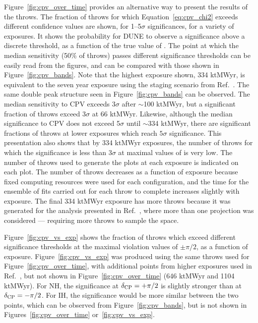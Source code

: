 Figure~\ref{fig:cpv_over_time} provides an alternative way to present the results of the throws. The fraction of throws for which Equation~\ref{eq:cpv_chi2} exceeds different confidence values are shown, for 1--5$\sigma$ significances, for a variety of exposures. It shows the probability for DUNE to observe a significance above a discrete threshold, as a function of the true value of \deltacp. The point at which the median sensitivity (50\% of throws) passes different significance thresholds can be easily read from the figures, and can be compared with those shown in Figure~\ref{fig:cpv_bands}. Note that the highest exposure shown, 334 ktMWyr, is equivalent to the seven year exposure using the staging scenario from Ref.~\cite{Abi:2020qib}. The same double peak structure seen in Figure~\ref{fig:cpv_bands} can be observed. The median sensitivity to CPV exceeds 3$\sigma$ after $\sim$100 ktMWyr, but a significant fraction of throws exceed 3$\sigma$ at 66 ktMWyr. Likewise, although the median significance to CPV does not exceed 5$\sigma$ until $\sim$334 ktMWyr, there are significant fractions of throws at lower exposures which reach $5\sigma$ significance. This presentation also shows that by 334 ktMWyr exposures, the number of throws for which the significance is less than 3$\sigma$ at maximal values of \deltacp is very low. The number of throws used to generate the plots at each exposure is indicated on each plot. The number of throws decreases as a function of exposure because fixed computing resources were used for each configuration, and the time for the ensemble of fits carried out for each throw to complete increases slightly with exposure. The final 334 ktMWyr exposure has more throws because it was generated for the analysis presented in Ref.~\cite{Abi:2020qib}, where more than one projection was considered --- requiring more throws to sample the space.

Figure~\ref{fig:cpv_vs_exp} shows the fraction of throws which exceed different significance thresholds at the maximal \deltacp violation values of $\pm\pi/2$, as a function of exposure. Figure~\ref{fig:cpv_vs_exp} was produced using the same throws used for Figure~\ref{fig:cpv_over_time}, with additional points from higher exposures used in Ref.~\cite{Abi:2020qib}, but not shown in Figure~\ref{fig:cpv_over_time} (646 ktMWyr and 1104 ktMWyr). For NH, the significance at $\delta_{\rm CP} = +\pi/2$ is slightly stronger than at $\delta_{\rm CP} = -\pi/2$. For IH, the significance would be more similar between the two points, which can be observed from Figure~\ref{fig:cpv_bands}, but is not shown in Figures~\ref{fig:cpv_over_time} or~\ref{fig:cpv_vs_exp}.

